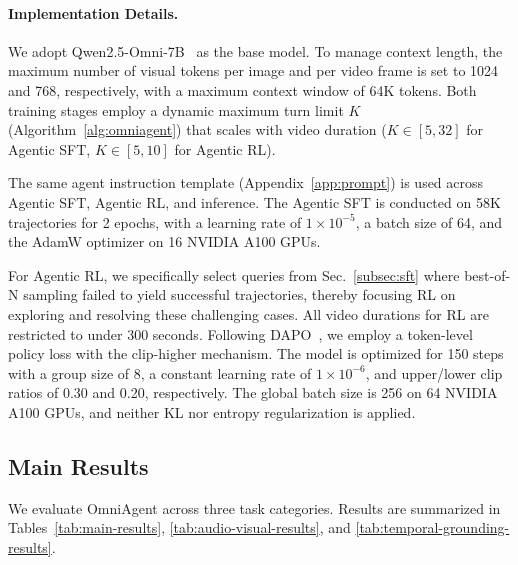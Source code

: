 \documentclass{article}
\theoremstyle{plain}
\theoremstyle{definition}
\theoremstyle{remark}
\begin{document}
\paragraph{Implementation Details.}
We adopt Qwen2.5-Omni-7B~\cite{qwen2.5omni} as the base model. To manage context length, the maximum number of visual tokens per image and per video frame is set to 1024 and 768, respectively, with a maximum context window of 64K tokens. Both training stages employ a dynamic maximum turn limit $K$ (Algorithm~\ref{alg:omniagent}) that scales with video duration ($K \in [5, 32]$ for Agentic SFT, $K \in [5, 10]$ for Agentic RL). 

The same agent instruction template (Appendix~\ref{app:prompt}) is used across Agentic SFT, Agentic RL, and inference. The Agentic SFT is conducted on 58K trajectories for 2 epochs, with a learning rate of $1 \times 10^{-5}$, a batch size of 64, and the AdamW optimizer on 16 NVIDIA A100 GPUs. 

For Agentic RL, we specifically select queries from Sec.~\ref{subsec:sft} where best-of-N sampling failed to yield successful trajectories, thereby focusing RL on exploring and resolving these challenging cases. All video durations for RL are restricted to under 300 seconds. Following DAPO~\cite{yu2025dapo}, we employ a token-level policy loss with the clip-higher mechanism. The model is optimized for 150 steps with a group size of 8, a constant learning rate of $1 \times 10^{-6}$, and upper/lower clip ratios of 0.30 and 0.20, respectively. The global batch size is 256 on 64 NVIDIA A100 GPUs, and neither KL nor entropy regularization is applied.

\subsection{Main Results}
\label{sec:main_results}

We evaluate OmniAgent across three task categories. Results are summarized in Tables~\ref{tab:main-results}, \ref{tab:audio-visual-results}, and \ref{tab:temporal-grounding-results}.
\end{document}
